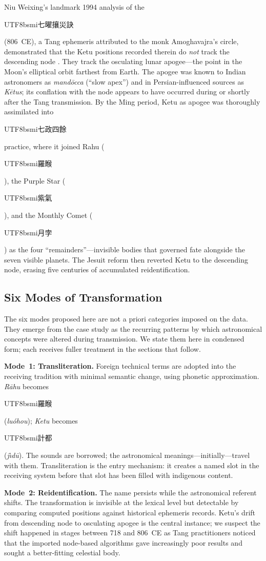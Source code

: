 \documentclass[10pt,a4paper]{article}
\newcommand{\zh}[1]{\begin{CJK}{UTF8}{bsmi}#1\end{CJK}}
\begin{document}
Niu Weixing's landmark 1994 analysis of the \zh{七曜攘災訣} (806~CE), a Tang
ephemeris attributed to the monk Amoghavajra's circle, demonstrated that the
Ketu positions recorded therein do \emph{not} track the descending node
\cite{niu1995ketu}.  They track the osculating lunar apogee---the point in the
Moon's elliptical orbit farthest from Earth.  The apogee was known to Indian
astronomers as \textit{mand\=occa} (``slow apex'') and in Persian-influenced
sources as \textit{K\=etus}; its conflation with the node appears to have
occurred during or shortly after the Tang transmission.  By the Ming period,
Ketu as apogee was thoroughly assimilated into \zh{七政四餘} practice, where it
joined Rahu (\zh{羅睺}), the Purple Star (\zh{紫氣}), and the Monthly Comet
(\zh{月孛}) as the four ``remainders''---invisible bodies that governed fate
alongside the seven visible planets.  The Jesuit reform then reverted Ketu to
the descending node, erasing five centuries of accumulated reidentification.

\subsection*{Six Modes of Transformation}

The six modes proposed here are not a priori categories imposed on the data.
They emerge from the case study as the recurring patterns by which astronomical
concepts were altered during transmission.  We state them here in condensed form;
each receives fuller treatment in the sections that follow.

\textbf{Mode~1: Transliteration.}  Foreign technical terms are adopted into the
receiving tradition with minimal semantic change, using phonetic approximation.
\textit{R\=ahu} becomes \zh{羅睺} (\textit{lu\'ohou}); \textit{Ketu} becomes
\zh{計都} (\textit{j\`{\i}d\=u}).  The sounds are borrowed; the astronomical
meanings---initially---travel with them.  Transliteration is the entry mechanism:
it creates a named slot in the receiving system before that slot has been filled
with indigenous content.

\textbf{Mode~2: Reidentification.}  The name persists while the astronomical
referent shifts.  The transformation is invisible at the lexical level but
detectable by comparing computed positions against historical ephemeris records.
Ketu's drift from descending node to osculating apogee is the central instance;
we suspect the shift happened in stages between 718 and 806~CE as Tang
practitioners noticed that the imported node-based algorithms gave increasingly
poor results and sought a better-fitting celestial body.
\end{document}
